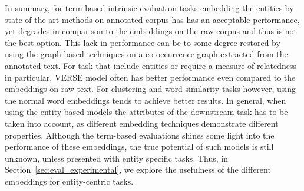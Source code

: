 In summary, for term-based intrinsic evaluation tasks embedding the entities by state-of-the-art methods on annotated corpus has has an acceptable performance, yet degrades in comparison to the embeddings on the raw corpus and thus is not the best option. This lack in performance can be to some degree restored by using the graph-based techniques on a co-occurrence graph extracted from the annotated text. For task that include entities or require a measure of relatedness in particular, VERSE model often has better performance even compared to the embeddings on raw text. For clustering and word similarity tasks however, using the normal word embeddings tends to achieve better results. In general, when using the entity-based models the attributes of the downstream task has to be taken into account, as different embedding techniques demonstrate different properties. Although the term-based evaluations shines some light into the performance of these embeddings, the true potential of such models is still unknown, unless presented with entity specific tasks. Thus, in Section~\ref{sec:eval_experimental}, we explore the usefulness of the different embeddings for entity-centric tasks.
